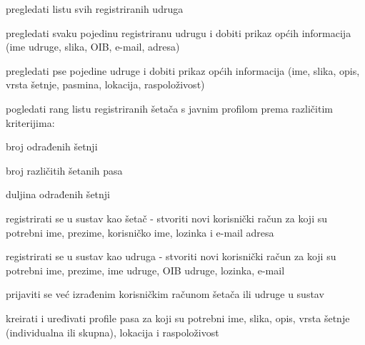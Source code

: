 			
			\begin{packed_enum}
				\item  {}
				
				\begin{packed_enum}
					
					\item pregledati listu svih registriranih udruga
					
					\item pregledati svaku pojedinu registriranu udrugu i dobiti prikaz općih informacija (ime udruge, slika, OIB, e-mail, adresa)
					
					\item pregledati pse pojedine udruge i dobiti prikaz općih  informacija (ime, slika, opis, vrsta šetnje, pasmina, lokacija, raspoloživost)
					
					\item pogledati rang listu registriranih šetača s javnim profilom prema različitim kriterijima:
					\begin{packed_enum}
					    \item broj odrađenih šetnji
					    \item broj različitih šetanih pasa
					    \item duljina odrađenih šetnji
					\end{packed_enum}
			
					\item registrirati se u sustav kao šetač - stvoriti novi korisnički račun za koji su potrebni ime, prezime, korisničko ime, lozinka i e-mail adresa
					
					\item registrirati se u sustav kao udruga - stvoriti novi korisnički račun za koji su potrebni ime, prezime, ime udruge, OIB udruge, lozinka, e-mail
					
					\item prijaviti se već izrađenim korisničkim računom šetača ili udruge u sustav
					
				\end{packed_enum}
			
				\item  \underbar{Udruga (inicijator)  može:}
				
				\begin{packed_enum}
					
					\item kreirati i uređivati profile pasa za koji su potrebni ime, slika, opis, vrsta šetnje (individualna ili skupna), lokacija i raspoloživost  
					

\end{packed_enum}
\end{packed_enum}
